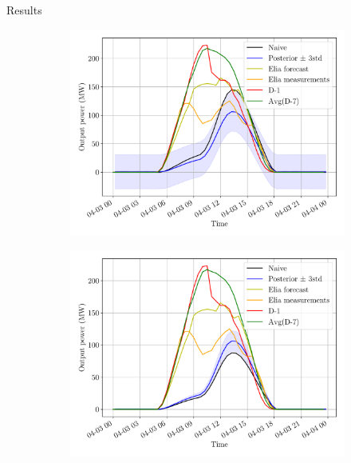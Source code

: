 \documentclass[12pt]{beamer}
\begin{document}
\begin{frame}{Results}
    \begin{figure}[H]
	\centering
	\begin{subfigure}{0.48\textwidth}
		\centering
		\includegraphics[width=\textwidth]{resources/pdf/solar_panelwise_START_FOR_03-04-2020.pdf}
	\end{subfigure}
	\hspace{0em}
	\begin{subfigure}{0.48\textwidth}
		\centering
		\includegraphics[width=\textwidth]{resources/pdf/solar_provincial_START_FOR_03-04-2020.pdf}
	\end{subfigure}
\end{figure}
\end{frame}
\end{document}
